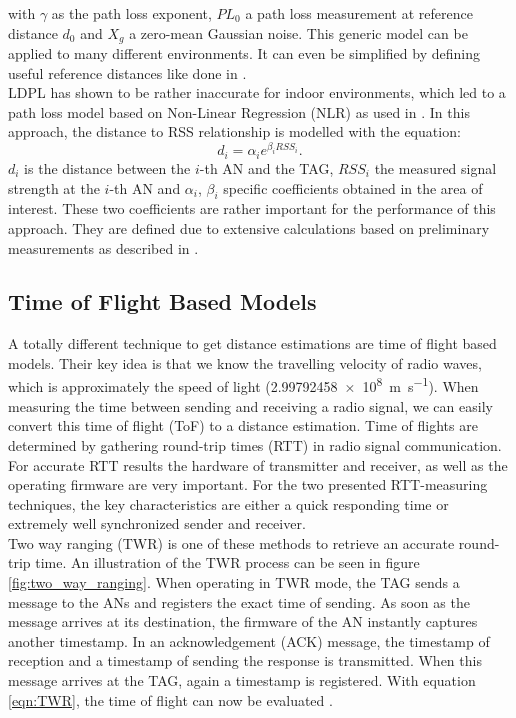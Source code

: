 with $\gamma$ as the path loss exponent, $PL_{0}$ a path loss measurement at reference distance $d_0$ and $X_{g}$ a zero-mean Gaussian noise. This generic model can be applied to many different environments. It can even be simplified by defining useful reference distances like done in \cite{Kurt}.\\
\noindent\hspace*{5mm}%
LDPL has shown to be rather inaccurate for indoor environments, which led to a path loss model based on Non-Linear Regression (NLR) as used in \cite{ZanLi}. In this approach, the distance to RSS relationship is modelled with the equation:
\begin{equation}
d_{i} = \alpha_{i} e^{\beta_{i}RSS_{i}}.
\label{eqn:NLR}
\end{equation}
$d_{i}$ is the distance between the $i$-th AN and the TAG, $RSS_{i}$ the measured signal strength at the $i$-th AN and $\alpha_{i}$, $\beta_{i}$ specific coefficients obtained in the area of interest. These two coefficients are rather important for the performance of this approach. They are defined due to extensive calculations based on preliminary measurements as described in \cite{Kurt}.


\subsection{Time of Flight Based Models}
A totally different technique to get distance estimations are time of flight based models. Their key idea is that we know the travelling velocity of radio waves, which is approximately the speed of light (\SI{2.99792458e8}{\meter\per\second}). When measuring the time between sending and receiving a radio signal, we can easily convert this time of flight (ToF) to a distance estimation. Time of flights are determined by gathering round-trip times (RTT) in radio signal communication. For accurate RTT results the hardware of transmitter and receiver, as well as the operating firmware are very important. For the two presented RTT-measuring techniques, the key characteristics are either a quick responding time or extremely well synchronized sender and receiver.\\
\noindent\hspace*{5mm}%
Two way ranging (TWR) is one of these methods to retrieve an accurate round-trip time. An illustration of the TWR process can be seen in figure \ref{fig:two_way_ranging}. When operating in TWR mode, the TAG sends a message to the ANs and registers the exact time of sending. As soon as the message arrives at its destination, the firmware of the AN instantly captures another timestamp. In an acknowledgement (ACK) message, the timestamp of reception and a timestamp of sending the response is transmitted. When this message arrives at the TAG, again a timestamp is registered. With equation \ref{eqn:TWR}, the time of flight can now be evaluated \cite{SewioTWR}.

